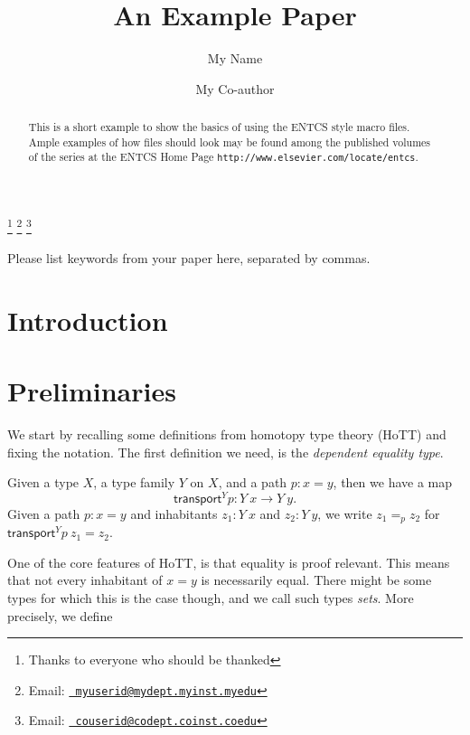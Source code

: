 \documentclass[9pt]{entcs}
\newcommand{\function}[1]{\mathsf{#1}}
\newcommand{\0}{\textbf{0}} %
\newcommand{\1}{\textbf{1}} %
\newcommand{\transport}[2]{\function{transport}^{#1} #2} %
\newcommand{\depeq}[3]{#2 =_{#1} #3} %
\begin{document}
\begin{frontmatter}
  \title{An Example Paper} \author{My
    Name}
  \address{My Department\\ My University\\
    My City, My Country} \author{My Co-author}
  \address{My Co-author's Department\\My Co-author's University\\
    My Co-author's City, My Co-author's Country} \thanks[ALL]{Thanks
    to everyone who should be thanked} \thanks[myemail]{Email:
    \href{mailto:myuserid@mydept.myinst.myedu} {\texttt{\normalshape
        myuserid@mydept.myinst.myedu}}} \thanks[coemail]{Email:
    \href{mailto:couserid@codept.coinst.coedu} {\texttt{\normalshape
        couserid@codept.coinst.coedu}}}
\begin{abstract} 
  This is a short example to show the basics of using the ENTCS style
  macro files.  Ample examples of how files should look may be found
  among the published volumes of the series at the ENTCS Home Page
  \texttt{http://www.elsevier.com/locate/entcs}.
\end{abstract}
\begin{keyword}
  Please list keywords from your paper here, separated by commas.
\end{keyword}
\end{frontmatter}
\section{Introduction}
\label{intro}

\section{Preliminaries}
\label{sec:prelim}
We start by recalling some definitions from homotopy type theory (HoTT) and fixing the notation.
The first definition we need, is the \emph{dependent equality type}.

\begin{definition}
\label{def:depeq}
Given a type $X$, a type family $Y$ on $X$, and a path $p : x = y$, then we have a map
\[
\transport{Y}{p} : Y \> x \rightarrow Y \> y.
\]
Given a path $p : x = y$ and inhabitants $z_1 : Y \> x$ and $z_2 : Y \> y$, we write $\depeq{p}{z_1}{z_2}$ for $\transport{Y}{p} \> z_1 = z_2$.
\end{definition}

One of the core features of HoTT, is that equality is proof relevant.
This means that not every inhabitant of $x = y$ is necessarily equal.
There might be some types for which this is the case though, and we call such types \emph{sets}.
More precisely, we define
\end{document}
